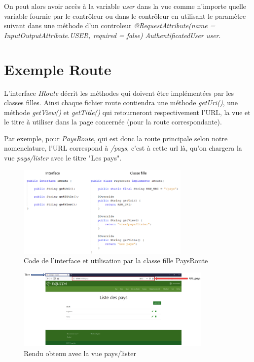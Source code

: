 			\noindent
			On peut alors avoir accès à la variable \textit{user} dans la vue comme n'importe quelle variable fournie par le contrôleur ou dans le contrôleur en utilisant le paramètre suivant dans une méthode d'un controleur \textit{@RequestAttribute(name = InputOutputAttribute.USER, required = false) AuthentificatedUser user}.

	\section{Exemple Route}

		L'interface \textit{IRoute} décrit les méthodes qui doivent être implémentées par les classes filles.\newline
		Ainsi chaque fichier route contiendra une méthode \textit{getUri()}, une méthode \textit{getView()} et \textit{getTitle()} qui retourneront respectivement l'URL, la vue et le titre à utiliser dans la page concernée (pour la route correspondante).

		\noindent
		Par exemple, pour \textit{PaysRoute}, qui est donc la route principale selon notre nomenclature, l'URL correspond à \textit{/pays}, c'est à cette url là, qu'on chargera la vue \textit{pays/lister} avec le titre "Les pays".

		\begin{figure}[H]
			\centering\includegraphics[width=0.75\textwidth, keepaspectratio]{res/paysRoute.png}
			\caption{Code de l'interface et utilisation par la classe fille PaysRoute}
		\end{figure}

		\begin{figure}[H]
			\centering\includegraphics[width=0.85\textwidth, keepaspectratio]{res/renduPaysRoute.png}
			\caption{Rendu obtenu avec la vue pays/lister}
		\end{figure}

